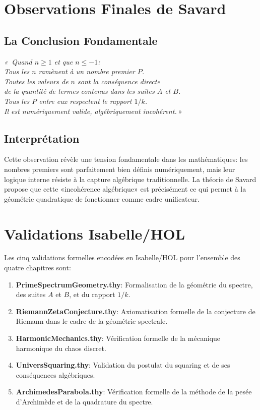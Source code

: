 \documentclass[12pt,a4paper]{article}
\begin{document}
\section{Observations Finales de Savard}

\subsection{La Conclusion Fondamentale}

\begin{center}
\large\textit{«\, Quand $n \geq 1$ et que $n \leq -1$:}\\[0.3em]
\textit{Tous les $n$ ramènent à un nombre premier $P$.}\\[0.3em]
\textit{Toutes les valeurs de $n$ sont la conséquence directe}\\
\textit{de la quantité de termes contenus dans les suites $A$ et $B$.}\\[0.3em]
\textit{Tous les $P$ entre eux respectent le rapport $1/k$.}\\[0.3em]
\textit{Il est numériquement valide, algébriquement incohérent.\,»}
\end{center}

\subsection{Interprétation}

Cette observation révèle une tension fondamentale dans les mathématiques: les
nombres premiers sont parfaitement bien définis numériquement, mais leur logique
interne résiste à la capture algébrique traditionnelle. La théorie de Savard propose
que cette «incohérence algébrique» est précisément ce qui permet à la géométrie
quadratique de fonctionner comme cadre unificateur.

\section{Validations Isabelle/HOL}

Les cinq validations formelles encodées en Isabelle/HOL pour l'ensemble des quatre
chapitres sont:

\begin{enumerate}
  \item \textbf{PrimeSpectrumGeometry.thy}: Formalisation de la géométrie du spectre,
        des suites $A$ et $B$, et du rapport $1/k$.
  \item \textbf{RiemannZetaConjecture.thy}: Axiomatisation formelle de la conjecture
        de Riemann dans le cadre de la géométrie spectrale.
  \item \textbf{HarmonicMechanics.thy}: Vérification formelle de la mécanique
        harmonique du chaos discret.
  \item \textbf{UniversSquaring.thy}: Validation du postulat du squaring et de ses
        conséquences algébriques.
  \item \textbf{ArchimedesParabola.thy}: Vérification formelle de la méthode de la
        pesée d'Archimède et de la quadrature du spectre.
\end{enumerate}
\end{document}
